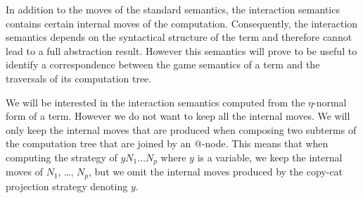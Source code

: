 In addition to the moves of the standard semantics, the interaction semantics contains certain
internal moves of the computation.
Consequently, the interaction semantics depends on the syntactical structure of the term and therefore cannot
lead to a full abstraction result. However this semantics will prove to be useful to identify
a correspondence between the game semantics
of a term and the traversals of its computation tree.

We will be interested in the interaction semantics computed from the
$\eta$-normal form of a term. However we do not want to keep all the internal moves. We will only keep the internal
moves that are produced when composing two subterms of the computation tree that are joined by an @-node.
This means that when computing the strategy of
$y N_1 \ldots N_p$ where $y$ is a variable, we keep the internal moves of $N_1$, \ldots, $N_p$, but
we omit the internal moves produced by the copy-cat projection strategy denoting $y$.

